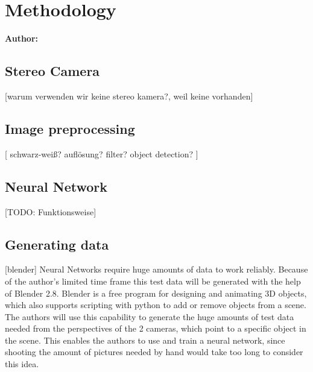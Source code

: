 \chapter{Methodology}

\textbf{Author: } 

\section{Stereo Camera}
[warum verwenden wir keine stereo kamera?, weil keine vorhanden]

\section{Image preprocessing}
[
schwarz-weiß?
auflösung?
filter?
object detection?
]

\section{Neural Network}
[TODO: Funktionsweise]

\section{Generating data}
[blender]
Neural Networks require huge amounts of data to work reliably. Because of the author's limited time frame this test data will be generated with the help of Blender 2.8. Blender is a free program for designing and animating 3D objects, which also supports scripting with python to add or remove objects from a scene. The authors will use this capability to generate the huge amounts of test data needed from the perspectives of the 2 cameras, which point to a specific object in the scene. This enables the authors to use and train a neural network, since shooting the amount of pictures needed by hand would take too long to consider this idea.

\filbreak
